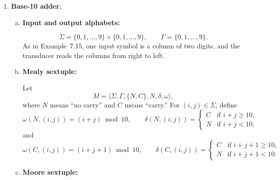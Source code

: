 \begin{enumerate}[{7.}1.]
\begin{enumerate}[(a)]
  \item \textbf{Circuit with \<EOS\> and \<SOS\>:}  Encode each trit by two bits,
  for example $0=00$, $1=01$, $2=10$, and encode a column
  $\langle a,b\rangle$ by the four bits of the two trits.  Reserve extra input
  codes for $\<SOS\>$ and $\<EOS\>$.  One flip-flop stores the carry bit $c$.
  The $\<SOS\>$ input forces $c=0$.  On an ordinary input column
  $\langle a,b\rangle$, the combinational network computes
  \[
    s\equiv a+b+c \pmod 3,\qquad
    c'=
    \begin{cases}
      1 & \text{if }a+b+c\ge 3,\\
      0 & \text{if }a+b+c\le 2,
    \end{cases}
  \]
  and sends the two-bit code of $s$ to the output device.  On $\<EOS\>$, the
  circuit outputs the final carry digit: print $1$ if $c=1$ and $0$ if $c=0$,
  then reset the flip-flop to $0$.  This is the required circuit implementation
  of the Mealy machine in part~(c).
\end{enumerate}

\item \textbf{Base-10 adder.}

\begin{enumerate}[(a)]
  \item \textbf{Input and output alphabets:}

  \[
    \Sigma=\{0,1,\ldots,9\}\times\{0,1,\ldots,9\},\qquad
    \Gamma=\{0,1,\ldots,9\}.
  \]
  As in Example~7.15, one input symbol is a column of two digits, and the
  transducer reads the columns from right to left.

  \item \textbf{Mealy sextuple:}

  Let
  \[
    M=\langle\Sigma,\Gamma,\{N,C\},N,\delta,\omega\rangle,
  \]
  where $N$ means ``no carry'' and $C$ means ``carry.''  For
  $(i,j)\in\Sigma$, define
  \[
    \omega(N,(i,j))=(i+j)\bmod 10,\qquad
    \delta(N,(i,j))=
    \begin{cases}
      C & \text{if } i+j\ge 10,\\
      N & \text{if } i+j<10,
    \end{cases}
  \]
  and
  \[
    \omega(C,(i,j))=(i+j+1)\bmod 10,\qquad
    \delta(C,(i,j))=
    \begin{cases}
      C & \text{if } i+j+1\ge 10,\\
      N & \text{if } i+j+1<10.
    \end{cases}
  \]

  \item \textbf{Moore sextuple:}


\end{enumerate}
\end{enumerate}
